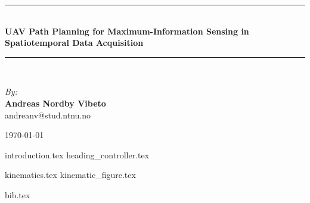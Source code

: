 \documentclass{article}
\newcommand{\HRule}{\rule{\linewidth}{0.5mm}}
\begin{document}
\begin{center}
\HRule \\[0.4cm]
{ \huge \bfseries UAV Path Planning for Maximum-Information Sensing in Spatiotemporal Data Acquisition}
\HRule \\[1.5cm]

\begin{center} \large
\emph{By:}\\
\textbf{Andreas Nordby Vibeto}\\
andreanv@stud.ntnu.no
\end{center}

\vfill

{\large \monthyear\today}

\end{center}
\newpage
{}

{introduction.tex}
{heading_controller.tex}

{kinematics.tex}
{kinematic_figure.tex}







\newpage
{bib.tex}
\end{document}
